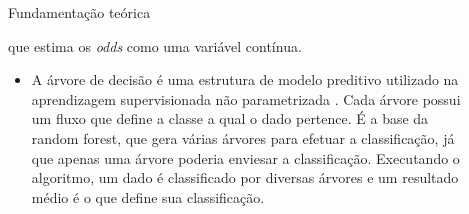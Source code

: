 \documentclass[final,hyperref={pdfpagelabels=false, brazil}]{beamer}
\begin{document}
\begin{frame}[t]
\begin{columns}[t]
\begin{column}{.465\textwidth}
\begin{block}{Fundamenta\c c\~ao te\'orica}
\begin{itemize}
\begin{itemize}
que estima os \emph{odds} como uma variável contínua. 

\end{itemize}

\begin{itemize}
\item A árvore de decisão é uma estrutura de modelo preditivo utilizado na aprendizagem supervisionada não parametrizada \cite{HASTIE}. Cada árvore possui um fluxo que define a classe a qual o dado pertence. É a base da random forest, que gera várias árvores para efetuar a classificação, já que apenas uma árvore poderia enviesar a classificação. Executando o algoritmo, um dado é classificado por diversas árvores e um resultado médio é o que define sua classificação.

\end{itemize}

\end{itemize}

\end{block}


\end{column} %

\begin{column}{.03\textwidth}\end{column} %
 
\begin{column}{.465\textwidth} %




\end{column}
\end{columns}
\end{frame}
\end{document}
